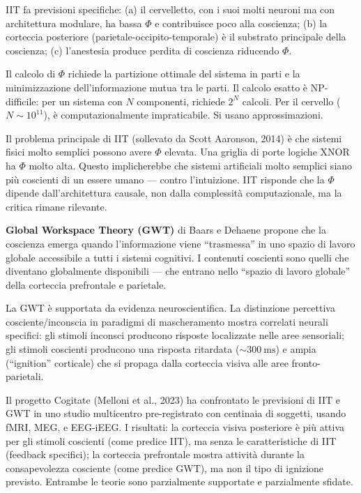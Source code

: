 \documentclass[11.5pt,a4paper,openany]{book}
\theoremstyle{remark}
\begin{document}
IIT fa previsioni specifiche: (a) il cervelletto, con i suoi molti neuroni ma con architettura modulare, ha bassa $\Phi$ e contribuisce poco alla coscienza; (b) la corteccia posteriore (parietale-occipito-temporale) è il substrato principale della coscienza; (c) l'anestesia produce perdita di coscienza riducendo $\Phi$.

Il calcolo di $\Phi$ richiede la partizione ottimale del sistema in parti e la minimizzazione dell'informazione mutua tra le parti. Il calcolo esatto è NP-difficile: per un sistema con $N$ componenti, richiede $2^N$ calcoli. Per il cervello ($N \sim 10^{11}$), è computazionalmente impraticabile. Si usano approssimazioni.

Il problema principale di IIT (sollevato da Scott Aaronson, 2014) è che sistemi fisici molto semplici possono avere $\Phi$ elevata. Una griglia di porte logiche XNOR ha $\Phi$ molto alta. Questo implicherebbe che sistemi artificiali molto semplici siano più coscienti di un essere umano --- contro l'intuizione. IIT risponde che la $\Phi$ dipende dall'architettura causale, non dalla complessità computazionale, ma la critica rimane rilevante.

\textbf{Global Workspace Theory (GWT)} di Baars e Dehaene propone che la coscienza emerga quando l'informazione viene ``trasmessa'' in uno spazio di lavoro globale accessibile a tutti i sistemi cognitivi. I contenuti coscienti sono quelli che diventano globalmente disponibili --- che entrano nello ``spazio di lavoro globale'' della corteccia prefrontale e parietale.

La GWT è supportata da evidenza neuroscientifica. La distinzione percettiva cosciente/inconscia in paradigmi di mascheramento mostra correlati neurali specifici: gli stimoli inconsci producono risposte localizzate nelle aree sensoriali; gli stimoli coscienti producono una risposta ritardata ($\sim 300\ \text{ms}$) e ampia (``ignition'' corticale) che si propaga dalla corteccia visiva alle aree fronto-parietali.

Il progetto Cogitate (Melloni et al., 2023) ha confrontato le previsioni di IIT e GWT in uno studio multicentro pre-registrato con centinaia di soggetti, usando fMRI, MEG, e EEG-iEEG. I risultati: la corteccia visiva posteriore è più attiva per gli stimoli coscienti (come predice IIT), ma senza le caratteristiche di IIT (feedback specifici); la corteccia prefrontale mostra attività durante la consapevolezza cosciente (come predice GWT), ma non il tipo di ignizione previsto. Entrambe le teorie sono parzialmente supportate e parzialmente sfidate.
\end{document}

